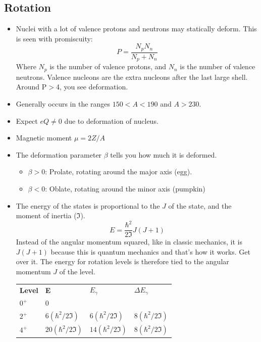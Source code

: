 \documentclass[letter]{article}
\begin{document}
\subsection{Rotation}
\begin{itemize}
\item Nuclei with a lot of valence protons and neutrons may statically
  deform. This is seen with promiscuity:
  \begin{equation*}
    P=\frac{N_pN_n}{N_p+N_n}
  \end{equation*}
Where $N_p$ is the number of valence protons, and $N_n$ is the number
of valence neutrons. Valence nucleons are the extra nucleons after the
last large shell. Around P$>$4, you see
deformation.~\cite[Lec. 13-16]{lecture}
\item Generally occurs in the ranges $150 < A < 190$ and $A > 230$.
\item Expect $eQ \neq 0$ due to deformation of nucleus.
\item Magnetic moment $\mu = 2Z/A$
\item The deformation parameter $\beta$ tells you how much it is
  deformed.~\cite[Lec. 13-16]{lecture}
  \begin{itemize}
  \item $\beta > 0$: Prolate, rotating around the major axis (egg).
  \item $\beta < 0$: Oblate, rotating around the minor axis (pumpkin)
  \end{itemize}
\item The energy of the states is proportional to the $J$ of the
  state, and the moment of inertia ($\Im$).
  \begin{equation*}
    E = \frac{\hbar^2}{2\Im}J(J+1)
  \end{equation*}
Instead of the angular momentum squared, like in classic mechanics, it
is $J(J+1)$ because this is quantum mechanics and that's how it
works. Get over it. The energy for rotation levels is therefore tied
to the angular momentum $J$ of the level.
\begin{table}[hbt]
\centering
\begin{tabular}{llll}
\textbf{Level} & \textbf{E}         & \textbf{$E_\gamma$}     & \textbf{$\Delta{}E_\gamma$} \\
$0^+$          & 0                  &                   &     \\
$2^+$          & $6(\hbar^2/2\Im)$  & $6(\hbar^2/2\Im)$ & $8(\hbar^2/2\Im)$    \\
$4^+$          & $20(\hbar^2/2\Im)$ & $14(\hbar^2/2\Im)$ & $8(\hbar^2/2\Im)$    \\

\end{tabular}
\end{table}
\end{itemize}
\end{document}
